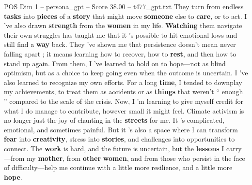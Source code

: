 \begin{textsample}{POS Dim 1 – persona\_gpt – Score 38.00 – t477\_gpt.txt}
They turn from endless \textbf{tasks} into \textbf{pieces} of a \textbf{story} that might move \textbf{someone} else to \textbf{care}, or to act.
I ’ve also drawn \textbf{strength} from the \textbf{women} in my life. \textbf{Watching} them navigate their own struggles has taught me that it ’s possible to hit emotional lows and still find a \textbf{way} back.
They ’ve shown me that persistence doesn't mean never falling apart ; it means learning how to recover, how to \textbf{rest}, and then how to stand up again.
From them, I ’ve learned to hold on to hope—not as blind optimism, but as a choice to keep going even when the outcome is uncertain.
I ’ve also learned to recognize my own efforts.
For a long \textbf{time}, I tended to downplay my achievements, to treat them as accidents or as \textbf{things} that weren't “ enough ” compared to the scale of the crisis.
Now, I ’m learning to give myself credit for what I do manage to contribute, however small it might feel.
Climate activism is no longer just the joy of chanting in the \textbf{streets} for me.
It ’s complicated, emotional, and sometimes painful.
But it ’s also a space where I can transform \textbf{fear} into \textbf{creativity}, stress into \textbf{stories}, and challenges into opportunities to connect.
The \textbf{work} is hard, and the future is uncertain, but the \textbf{lessons} I carry—from my \textbf{mother}, from \textbf{other} \textbf{women}, and from those who persist in the face of difficulty—help me continue with a little more resilience, and a little more \textbf{hope}.

\end{textsample}
